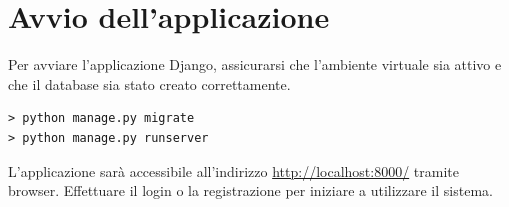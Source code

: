 \documentclass[a4paper,12pt]{report}
\begin{document}
\section{Avvio dell'applicazione}

Per avviare l'applicazione Django, assicurarsi che l'ambiente virtuale sia attivo e che il database
sia stato creato correttamente.

\begin{verbatim}
> python manage.py migrate
> python manage.py runserver
\end{verbatim}

L'applicazione sarà accessibile all'indirizzo \url{http://localhost:8000/} tramite browser. Effettuare
il login o la registrazione per iniziare a utilizzare il sistema.
\end{document}
